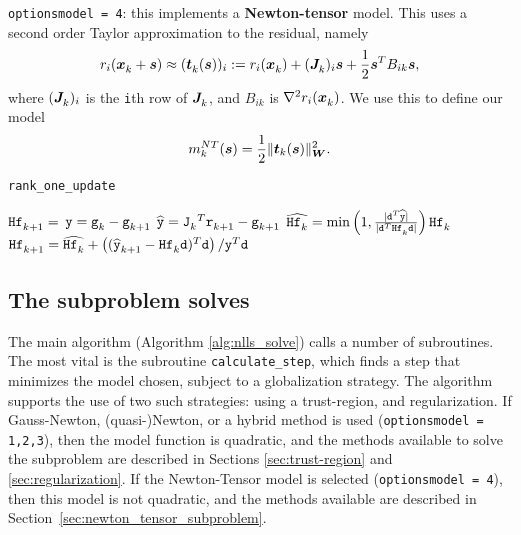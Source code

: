 \begin{description}
\item {\tt options\ct model = 4}: this implements a {\bf Newton-tensor} model.
This uses a second order Taylor approximation to the residual, namely
\[r_i(\iter{\vx} + \vs) \approx (\iter{\vt}(\vs))_i := r_i(\iter{\vx}) + (\iter{\vJ})_i\vs + \frac{1}{2}\vs^T B_{ik}\vs,\]
where $(\iter{\vJ})_i$ is the {\tt i}th row of $\iter{\vJ}$, and $B_{ik}$ is $\nabla^2 r_i(\iter{\vx})$.  We use this to define our model
\begin{equation}
  \label{eq:newton-tensor-model}
  m_k^{NT}(\vs) = \frac{1}{2}\|\vt_k(\vs)\|_\vW^2.
\end{equation}

\end{description}


\begin{algorithm}
\caption{{\tt rank\_one\_update}}
\label{alg:rank_one_update}
  \begin{algorithmic}
     $\iter[k+1]{\thess} = $ 
    \State $\ty = \iter[k]{\tg} - \iter[k+1]{\tg}$ \State
    $\widehat{\ty} = {\iter[k]{\tJ}}^T \iter[k+1]{\tr} -
    \iter[k+1]{\tg}$ \State $\widehat{\iter[k]{\thess}} = \min\left(
      1, \frac{|\td^T\widehat{\ty}|}{|\td^T\iter[k]{\thess}\td|}\right)
    \iter[k]{\thess}$ \State $\iter[k+1]{\thess} =
    \widehat{\iter[k]{\thess}} + \left(({\iter[k+1]{\widehat{\ty}}} -
      \iter[k]{\thess}\td )^T\td\right)/\ty^T\td$

  \end{algorithmic}
\end{algorithm}


\subsection{The subproblem solves}
\label{sec:subproblem solves}


The main algorithm (Algorithm \ref{alg:nlls_solve}) calls a number of subroutines.
The most vital is the subroutine {\tt calculate\_step}, which finds a step that
minimizes the model chosen, subject to a globalization strategy.  The algorithm
supports the use of two such strategies: using a trust-region, and regularization.
If Gauss-Newton, (quasi-)Newton, or a hybrid method is used
({\tt options\ct model = 1,2,3}), then the model function is quadratic, and
the methods available to solve the subproblem are described in
Sections \ref{sec:trust-region} and \ref{sec:regularization}.
If the Newton-Tensor model is selected ({\tt options\ct model = 4}), then this
model is not quadratic, and the methods available are described in Section~\ref{sec:newton_tensor_subproblem}.

